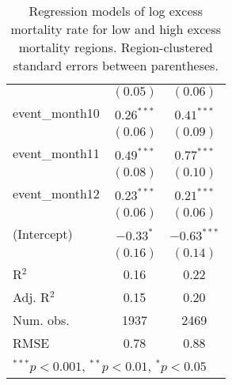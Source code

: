 \begin{table}
\begin{center}
\begin{tabular}{l c c }
                     & $(0.05)$     & $(0.06)$      \\
event\_month10       & $0.26^{***}$ & $0.41^{***}$  \\
                     & $(0.06)$     & $(0.09)$      \\
event\_month11       & $0.49^{***}$ & $0.77^{***}$  \\
                     & $(0.08)$     & $(0.10)$      \\
event\_month12       & $0.23^{***}$ & $0.21^{***}$  \\
                     & $(0.06)$     & $(0.06)$      \\
(Intercept)          & $-0.33^{*}$  & $-0.63^{***}$ \\
                     & $(0.16)$     & $(0.14)$      \\
\hline
R$^2$                & 0.16         & 0.22          \\
Adj. R$^2$           & 0.15         & 0.20          \\
Num. obs.            & 1937         & 2469          \\
RMSE                 & 0.78         & 0.88          \\
\hline
\multicolumn{3}{l}{\scriptsize{$^{***}p<0.001$, $^{**}p<0.01$, $^*p<0.05$}}
\end{tabular}
\caption{Regression models of log excess mortality rate for low and high excess mortality regions. Region-clustered standard errors between parentheses.}
\label{tab:hilomodels}
\end{center}
\end{table}
